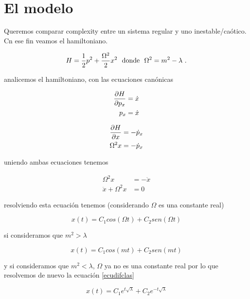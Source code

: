 \documentclass[../Main.tex]{subfiles}
\begin{document}
\section{El modelo}
Queremos comparar complexity entre un sistema regular y uno inestable/caótico. Cn ese fin veamos el hamiltoniano.

\begin{equation}
H = \frac{1}{2} p^2 + \frac{\Omega^2}{2} x^2
\ \ {\rm donde} \ \  \Omega^2 = m^2 - \lambda \ .
\end{equation}

analicemos el hamiltoniano, con las ecuaciones canónicas

\begin{equation}
\begin{split}
\pdv{H}{p_x} &= \dot{x} \\
p_x &= \dot{x} 
\end{split}
\end{equation}  

\begin{equation}
\begin{split}
\pdv{H}{x} &= -\dot{p}_x \\
\Omega^2 x &= -\dot{p}_x 
\end{split}
\end{equation} 

uniendo ambas ecuaciones tenemos

\begin{equation}
\begin{split}
\Omega^2 x &= -\ddot{x} \\
\ddot{x}+\Omega^2 x & =0 
\end{split}
\label{ecudifclas}
\end{equation} 
 
resolviendo esta ecuación tenemos (considerando $\Omega$ es una constante real)

\begin{equation}
x(t)=C_1 cos(\Omega t)+C_2 sen(\Omega t)
\end{equation}

si consideramos que $m^2>\lambda$

\begin{equation}
x(t)=C_1 cos(m t)+C_2 sen(m t)
\label{solclas1}
\end{equation}

y si consideramos que $m^2<\lambda$, $\Omega$ ya no es una constante real por lo que resolvemos de nuevo la ecuación \eqref{ecudifclas} 

\begin{equation}
x(t)=C_1 e^{t\sqrt{\lambda}}+C_2 e^{-t\sqrt{\lambda}}
\label{solclas2}
\end{equation}
\end{document}
